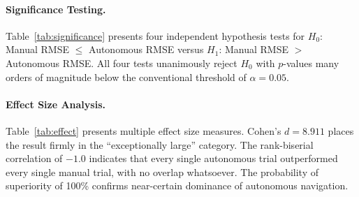 \paragraph{Significance Testing.}
Table~\ref{tab:significance} presents four independent hypothesis
tests for $H_0$: Manual RMSE $\leq$ Autonomous RMSE versus $H_1$:
Manual RMSE $>$ Autonomous RMSE. All four tests unanimously reject
$H_0$ with $p$-values many orders of magnitude below the conventional
threshold of $\alpha = 0.05$.

\begin{table}[tbp]
  \centering
  \caption{Significance testing results ($H_1$: Manual RMSE $>$ Autonomous RMSE).}
  \label{tab:significance}
\end{table}

\paragraph{Effect Size Analysis.}
Table~\ref{tab:effect} presents multiple effect size measures.
Cohen's $d = 8.911$ places the result firmly in the ``exceptionally
large'' category. The rank-biserial correlation of $-1.0$
indicates that every single autonomous trial outperformed every single
manual trial, with no overlap whatsoever. The probability of superiority
of 100\% confirms near-certain dominance of autonomous navigation.

